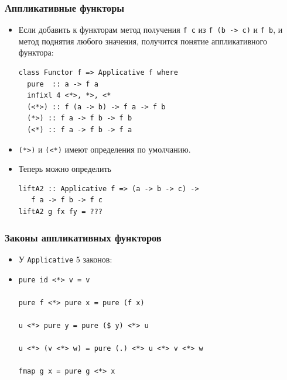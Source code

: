\documentclass[11pt]{beamer}
\begin{document}
\begin{frame}[fragile]
\frametitle{Аппликативные функторы}
\begin{itemize}
    \item Если добавить к функторам метод получения \lstinline|f c| из \lstinline|f (b -> c)| и \lstinline|f b|, и метод поднятия любого значения, получится понятие аппликативного функтора:
\begin{lstlisting}[basicstyle=\ttfamily\small]
class Functor f => Applicative f where
  pure  :: a -> f a
  infixl 4 <*>, *>, <*
  (<*>) :: f (a -> b) -> f a -> f b
  (*>) :: f a -> f b -> f b
  (<*) :: f a -> f b -> f a
\end{lstlisting}
    \item \lstinline|(*>)| и \lstinline|(<*)| имеют определения по умолчанию.
    \item Теперь можно определить 
\begin{lstlisting}[basicstyle=\ttfamily\small]
liftA2 :: Applicative f => (a -> b -> c) -> 
   f a -> f b -> f c
liftA2 g fx fy = ???
\end{lstlisting}
\end{itemize}
\end{frame}

\begin{frame}[fragile]
\frametitle{Законы аппликативных функторов}
\begin{itemize}
    \item У \lstinline|Applicative| 5 законов:
    \item
\begin{lstlisting}
pure id <*> v = v

pure f <*> pure x = pure (f x)

u <*> pure y = pure ($ y) <*> u

u <*> (v <*> w) = pure (.) <*> u <*> v <*> w

fmap g x = pure g <*> x
\end{lstlisting}
\end{itemize}
\end{frame}
\end{document}
